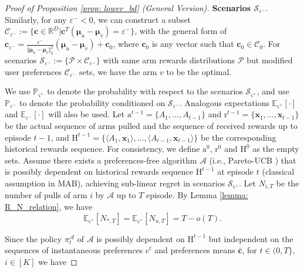 \begin{proof}[Proof of Proposition \ref{prop: lower_bd} (General Version)]
\textbf{Scenarios $\mathcal{S}_{\varepsilon^{-}}$}.
Similarly, for any $\varepsilon^{-} < 0$, we can construct a subset $\mathcal{C}_{\varepsilon^{-}} := \{ \boldsymbol{c} \in \mathbb{R}^D | \boldsymbol{c}^T ( \boldsymbol{\mu}_{u} - \boldsymbol{\mu}_{v} ) = \varepsilon^{-} \}$, with the general form of $\boldsymbol{c}_{\varepsilon^{-}} = \frac{\varepsilon^{-}}{ \Vert \boldsymbol{\mu}_{u} - \boldsymbol{\mu}_{v} \Vert_2^2 } (\boldsymbol{\mu}_{u} - \boldsymbol{\mu}_{v}) + \boldsymbol{c}_0$, where $\boldsymbol{c}_0$ is any vector such that $\boldsymbol{c}_0 \in \mathcal{C}_0$.
For scenarios $\mathcal{S}_{\varepsilon^{-}} := \{\mathcal{P} \times \mathcal{C}_{\varepsilon^{-}} \}$ with same arm rewards distributions $\mathcal{P}$ but modified user preferences $\mathcal{C}_{\varepsilon^{-}}$ sets, we have the arm $v$ to be the optimal.


We use $\mathbb{P}_{\varsigma^{+}}$ to denote the probability with respect to the scenarios $\mathcal{S}_{\varsigma^{+}}$, and use $\mathbb{P}_{\varepsilon^{-}}$ to denote the probability conditioned on $\mathcal{S}_{\varepsilon^{-}}$. Analogous expectations $\mathbb{E}_{\varsigma^{+}}[\cdot]$ and $\mathbb{E}_{\varepsilon^{-}}[\cdot]$ will also be used.
Let $\boldsymbol{\mathrm{a}}^{t-1} = \{ A_1,..., A_{t-1} \}$ and $\boldsymbol{\mathrm{r}}^{t-1} = \{ \boldsymbol{x}_{1}, ..., \boldsymbol{x}_{t-1} \}$ be the actual sequence of arms pulled and the sequence of received rewards up to episode $t-1$, and $\boldsymbol{\mathrm{H}}^{t-1} = \{ \langle A_1, \boldsymbol{x}_{1} \rangle, ..., \langle A_{t-1}, \boldsymbol{x}_{t-1} \rangle \}$ be the corresponding historical rewards sequence. 
For consistency, we define $\boldsymbol{\mathrm{a}}^{0}$, $\boldsymbol{\mathrm{r}}^{0}$ and $\boldsymbol{\mathrm{H}}^{0}$ as the empty sets.
Assume there exists a preferences-free algorithm $\mathcal{A}$ (i.e., Pareto-UCB \cite{drugan2013designing}) that is possibly dependent on historical rewards sequence $\boldsymbol{\mathrm{H}}^{t-1}$ at episode $t$ (classical assumption in MAB), 
achieving sub-linear regret in scenarios $\mathcal{S}_{\varsigma^{+}}$. Let $N_{i,T}$ be the number of pulls of arm $i$ by $\mathcal{A}$ up to $T$ episode. By Lemma \ref{lemma: R_N_relation}, we have 
\begin{equation}
\label{eq: E_N_+}
\mathbb{E}_{\varsigma^{+}}[N_{*,T}] = \mathbb{E}_{\varsigma^{+}}[N_{u,T}] = T - o(T).
\end{equation}

Since the policy $\pi^{\mathcal{A}}_t$ of $\mathcal{A}$ is possibly dependent on $\boldsymbol{\mathrm{H}}^{t-1}$ but independent on the sequences of instantaneous preferences $\boldsymbol{\mathrm{c}}^{t}$ and preferences means $\boldsymbol{\overline{c}}$, for $t \in (0,T\}$, $i \in [K]$ we have 


\end{proof}
